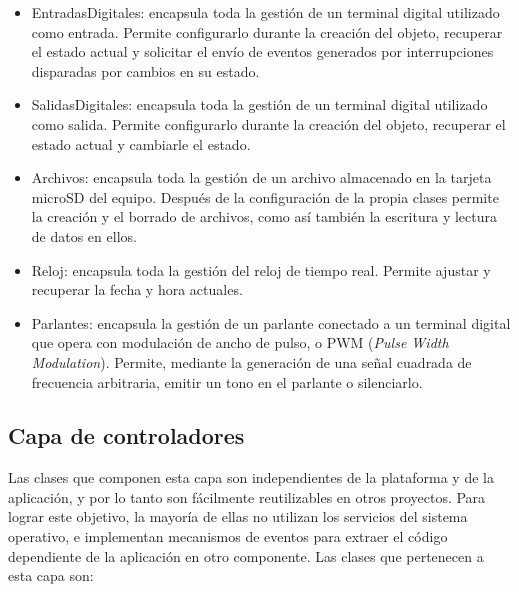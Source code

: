 \begin{itemize}
	\item EntradasDigitales: encapsula toda la gestión de un terminal digital utilizado como entrada. Permite configurarlo durante la creación del objeto, recuperar el estado actual y solicitar el envío de eventos generados por interrupciones disparadas por cambios en su estado.
	
	\item SalidasDigitales: encapsula toda la gestión de un terminal digital utilizado como salida. Permite configurarlo durante la creación del objeto, recuperar el estado actual y cambiarle el estado.
	
	\item Archivos: encapsula toda la gestión de un archivo almacenado en la tarjeta microSD del equipo. Después de la configuración de la propia clases permite la creación y el borrado de archivos, como así también la escritura y lectura de datos en ellos.
	
	\item Reloj: encapsula toda la gestión del reloj de tiempo real. Permite ajustar y recuperar la fecha y hora actuales.
	
	\item Parlantes: encapsula la gestión de un parlante conectado a un terminal digital que opera con modulación de ancho de pulso, o PWM (\emph{Pulse Width Modulation}). Permite, mediante la generación de una señal cuadrada de frecuencia arbitraria, emitir un tono en el parlante o silenciarlo.
\end{itemize}

\subsection{Capa de controladores}

Las clases que componen esta capa son independientes de la plataforma y de la aplicación, y por lo tanto son fácilmente reutilizables en otros proyectos. Para lograr este objetivo, la mayoría de ellas no utilizan  los servicios del sistema operativo, e implementan mecanismos de eventos para  extraer el código dependiente de la aplicación en otro componente. Las clases que pertenecen a esta capa son:

